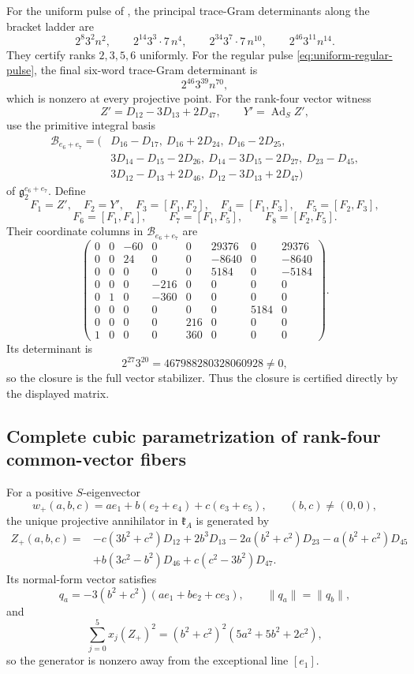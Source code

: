 \documentclass[11pt,a4paper]{article}
\newcommand{\gtwo}{\mathfrak g_2}
\newcommand{\Ad}{\operatorname{Ad}}
\begin{document}
For the uniform pulse of , the principal trace-Gram determinants along the bracket ladder are
\[
2^8 3^2n^2,
\qquad 2^{14}3^3\cdot7\,n^4,
\qquad 2^{34}3^7\cdot7\,n^{10},
\qquad 2^{46}3^{11}n^{14}.
\]
They certify ranks $2,3,5,6$ uniformly.  For the regular pulse \eqref{eq:uniform-regular-pulse}, the final six-word trace-Gram determinant is
\[
2^{46}3^{39}n^{70},
\]
which is nonzero at every projective point.  For the rank-four vector witness
\[
Z'=D_{12}-3D_{13}+2D_{47},\qquad Y'=\Ad_S Z',
\]
use the primitive integral basis
\begin{align*}
\mathcal B_{e_6+e_7}=(&D_{16}-D_{17},\ D_{16}+2D_{24},\ D_{16}-2D_{25},\\
&3D_{14}-D_{15}-2D_{26},\ D_{14}-3D_{15}-2D_{27},\ D_{23}-D_{45},\\
&3D_{12}-D_{13}+2D_{46},\ D_{12}-3D_{13}+2D_{47})
\end{align*}
of $\gtwo^{e_6+e_7}$.  Define
\[
F_1=Z',\quad F_2=Y',\quad F_3=[F_1,F_2],\quad F_4=[F_1,F_3],\quad F_5=[F_2,F_3],
\]
\[
F_6=[F_1,F_4],\qquad F_7=[F_1,F_5],\qquad F_8=[F_2,F_5].
\]
Their coordinate columns in $\mathcal B_{e_6+e_7}$ are
\[
\begin{pmatrix}
0&0&-60&0&0&29376&0&29376\\
0&0&24&0&0&-8640&0&-8640\\
0&0&0&0&0&5184&0&-5184\\
0&0&0&-216&0&0&0&0\\
0&1&0&-360&0&0&0&0\\
0&0&0&0&0&0&5184&0\\
0&0&0&0&216&0&0&0\\
1&0&0&0&360&0&0&0
\end{pmatrix}.
\]
Its determinant is
\[
2^{27}3^{20}=467988280328060928\ne0,
\]
so the closure is the full vector stabilizer.  Thus the closure is certified directly by the displayed matrix.

\subsection{Complete cubic parametrization of rank-four common-vector fibers}\label{app:rankfour-parametrization}
For a positive $S$-eigenvector
\[
w_+(a,b,c)=ae_1+b(e_2+e_4)+c(e_3+e_5),
\qquad (b,c)\ne(0,0),
\]
the unique projective annihilator in $\mathfrak k_A$ is generated by
\begin{align*}
Z_+(a,b,c)={}&-c(3b^2+c^2)D_{12}+2b^3D_{13}
-2a(b^2+c^2)D_{23}-a(b^2+c^2)D_{45}\\
&+b(3c^2-b^2)D_{46}+c(c^2-3b^2)D_{47}.
\end{align*}
Its normal-form vector satisfies
\[
q_a=-3(b^2+c^2)(ae_1+be_2+ce_3),
\qquad \lVert q_a\rVert=\lVert q_b\rVert,
\]
and
\[
\sum_{j=0}^{5}x_j(Z_+)^2
=(b^2+c^2)^2(5a^2+5b^2+2c^2),
\]
so the generator is nonzero away from the exceptional line $[e_1]$.
\end{document}
